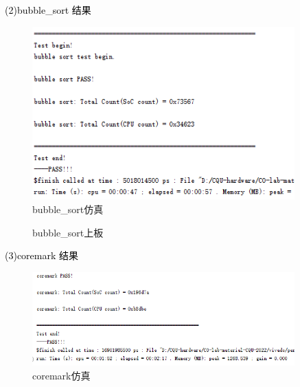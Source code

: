 \newpage
\textcolor{black}{(2)bubble\_sort 结果}\\
\begin{figure}[h]
    \centering
    \includegraphics[width=0.9\textwidth]{image/bubbleS.png}
    \caption{bubble\_sort仿真}
\end{figure}

\begin{figure}[h]
    \centering
    \caption{bubble\_sort上板}
\end{figure}

\newpage
\textcolor{black}{(3)coremark 结果}\\
\begin{figure}[htbp]
    \centering
    \includegraphics[width=0.9\textwidth]{image/coreS.png}
    \caption{coremark仿真}
\end{figure}

